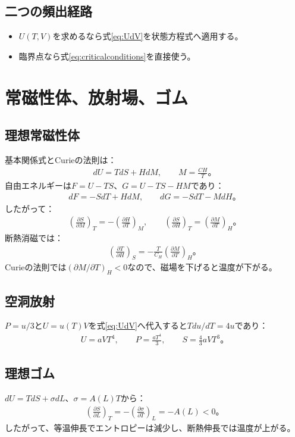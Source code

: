\documentclass[platex,dvipdfmx,a4paper,10pt]{jsarticle}
\begin{document}
\subsection{二つの頻出経路}
\begin{itemize}
  \item $U(T,V)$を求めるなら式\eqref{eq:UdV}を状態方程式へ適用する。
  \item 臨界点なら式\eqref{eq:criticalconditions}を直接使う。
\end{itemize}

\newpage
\section{常磁性体、放射場、ゴム}\label{sec:applications}
\subsection{理想常磁性体}
基本関係式とCurieの法則は：
\begin{align}
  dU=TdS+HdM,\qquad M=\frac{CH}{T}。\label{eq:magnetic}
\end{align}
自由エネルギーは$F=U-TS$、$G=U-TS-HM$であり：
\begin{align*}
  dF=-SdT+HdM,\qquad dG=-SdT-MdH。
\end{align*}
したがって：
\begin{align}
  \left(\frac{\partial S}{\partial M}\right)_T
  =-\left(\frac{\partial H}{\partial T}\right)_M,
  \qquad
  \left(\frac{\partial S}{\partial H}\right)_T
  =\left(\frac{\partial M}{\partial T}\right)_H。\label{eq:magmaxwell}
\end{align}
断熱消磁では：
\begin{align}
  \left(\frac{\partial T}{\partial H}\right)_S
  =-\frac{T}{C_H}\left(\frac{\partial M}{\partial T}\right)_H。\label{eq:demag}
\end{align}
Curieの法則では$(\partial M/\partial T)_H<0$なので、磁場を下げると温度が下がる。

\subsection{空洞放射}
$P=u/3$と$U=u(T)V$を式\eqref{eq:UdV}へ代入すると$Tdu/dT=4u$であり：
\begin{align}
  U=aVT^4,\qquad P=\frac{aT^4}{3},\qquad S=\frac{4}{3}aVT^3。\label{eq:radiation}
\end{align}

\subsection{理想ゴム}
$dU=TdS+\sigma dL$、$\sigma=A(L)T$から：
\begin{align}
  \left(\frac{\partial S}{\partial L}\right)_T
  =-\left(\frac{\partial\sigma}{\partial T}\right)_L=-A(L)<0。\label{eq:rubber}
\end{align}
したがって、等温伸長でエントロピーは減少し、断熱伸長では温度が上がる。
\end{document}
